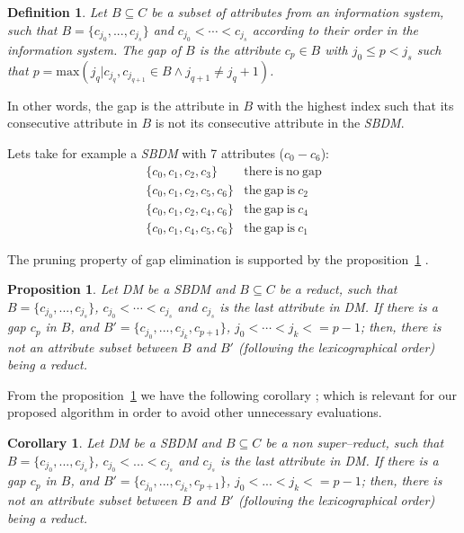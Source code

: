 \documentclass[authoryear,preprint,review,12pt]{elsarticle}
\newtheorem{proposition}{Proposition}
\newtheorem{definition}{Definition}
\newtheorem{corollary}{Corollary}
\begin{document}
	\begin{definition}\label{def:gap}
		Let $B \subseteq C$ be a subset of attributes from an information system, such that $B = \lbrace c_{j_0},...,c_{j_s}
		\rbrace$ and $c_{j_0}<\cdots <c_{j_s}$ according to their order in the information system. The gap of $B$ is the
		attribute $c_p \in B$ with $j_0 \leq p <	j_s$ such that $p=\mathrm{max}(j_q | c_{j_q},c_{j_{q+1}} \in 
		B \wedge j_{q+1} \neq j_q+1)$.
	\end{definition}
	
	In other words, the gap is the attribute in $B$ with the highest index such that its consecutive attribute in $B$ is not its consecutive attribute in the \textit{SBDM}.
	
	Lets take for example a \textit{SBDM} with 7 attributes ($c_0 - c_6$):
	$$\begin{array}{ll}
	\lbrace c_0,c_1,c_2,c_3\rbrace 		& \mathrm{there~is~no~gap}\\
	\lbrace c_0,c_1,c_2,c_5,c_6\rbrace 	& \mathrm{the~gap~is~} c_2\\
	\lbrace c_0,c_1,c_2,c_4,c_6\rbrace 	& \mathrm{the~gap~is~} c_4\\
	\lbrace c_0,c_1,c_4,c_5,c_6\rbrace 	& \mathrm{the~gap~is~} c_1
	\end{array}$$


	The pruning property of gap elimination is supported by the proposition~\ref{prop:gap} \citep{Santiesteban03}. 
%	
		
	\begin{proposition}\label{prop:gap} 
		Let DM be a SBDM and $B \subseteq C$ be a reduct, such that $B = \lbrace c_{j_0},...,c_{j_s}\rbrace$, $c_{j_0}<\cdots	<c_{j_s}$ and $c_{j_s}$ is the last attribute in DM. If there is a gap $c_p$ in $B$, and $B' = \lbrace c_{j_0},...,c_{j_k},c_{p+1}\rbrace$, $j_0<\cdots <j_k<=p-1$; then, there is not an attribute subset between $B$ and $B'$ (following the lexicographical order) being a reduct.
	\end{proposition}	
	
	From the proposition~\ref{prop:gap} we have the following corollary \citep{Santiesteban03}; which is relevant for our proposed algorithm in order to avoid other unnecessary evaluations.
	
	\begin{corollary}\label{coro:gap} 
		Let DM be a SBDM and $B \subseteq C$ be a non super--reduct, such that $B = \lbrace c_{j_0},...,c_{j_s}\rbrace$, $c_{j_0}<...<c_{j_s}$ and $c_{j_s}$ is the last attribute in DM. If there is a gap $c_p$ in $B$, and $B' = \lbrace c_{j_0},...,c_{j_k},c_{p+1}\rbrace$, $j_0<...<j_k<=p-1$; then, there is not an attribute subset between $B$ and $B'$ (following the lexicographical order) being a reduct.
	\end{corollary}
		
\end{document}
